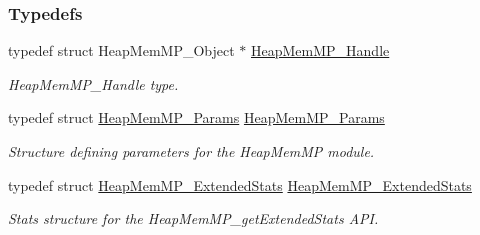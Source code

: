 \subsubsection*{Typedefs}
\begin{DoxyCompactItemize}
\item 
typedef struct HeapMemMP\_\-Object $\ast$ \hyperlink{_heap_mem_m_p_8h_a9aa6360e22c2f5f387c5aba52a1a8522}{HeapMemMP\_\-Handle}
\begin{DoxyCompactList}\small\item\em HeapMemMP\_\-Handle type. \item\end{DoxyCompactList}\item 
typedef struct \hyperlink{struct_heap_mem_m_p___params}{HeapMemMP\_\-Params} \hyperlink{_heap_mem_m_p_8h_a888191d73ac615e5335b1add34db69e8}{HeapMemMP\_\-Params}
\begin{DoxyCompactList}\small\item\em Structure defining parameters for the HeapMemMP module. \item\end{DoxyCompactList}\item 
typedef struct \hyperlink{struct_heap_mem_m_p___extended_stats}{HeapMemMP\_\-ExtendedStats} \hyperlink{_heap_mem_m_p_8h_a366cf280eda1086a46528b999b035618}{HeapMemMP\_\-ExtendedStats}
\begin{DoxyCompactList}\small\item\em Stats structure for the HeapMemMP\_\-getExtendedStats API. \item\end{DoxyCompactList}\end{DoxyCompactItemize}
